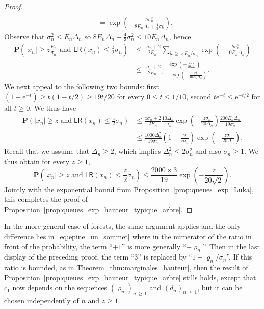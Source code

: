 \documentclass[AHL,Unicode,longabstracts,published]{cedram}
\newcommand{\ensembles}[1]{\mathbf{#1}}
\renewcommand{\P}{\ensembles{P}}
\renewcommand{\Pr}[1]{\P\left(#1\right)}
\newcommand{\1}{\ensembles{1}}
\renewcommand{\le}{\leqslant}
\renewcommand{\ge}{\geqslant}
\newcommand{\LR}{\mathsf{LR}}
\newcommand{\e}{\mathrm{e}}
\newcommand{\edges}{E}
\begin{document}
\begin{proof}
\begin{align*}
\\
&= \exp\left(- \frac{h \sigma_n^2}{8 \edges_n \Delta_n + \frac{4}{3} \sigma_n^2}\right).
\end{align*}
Observe that $\sigma_n^2 \le \edges_n \Delta_n$ so $8 \edges_n \Delta_n + \frac{4}{3} \sigma_n^2 \le 10 \edges_n \Delta_n$, hence
\begin{align*}
\Pr{|x_n| \ge z \frac{\edges_n}{\sigma_n} \text{ and } \LR(x_n) \le \frac{z}{2} \sigma_n} &\le \frac{z \sigma_n + 2}{2 \edges_n} \sum_{h\,\ge\,z\,\edges_n / \sigma_n} \exp\left(- \frac{h \sigma_n^2}{10 \edges_n \Delta_n}\right)
\\
&\le \frac{z \sigma_n + 2}{2 \edges_n}
\frac{\exp\left(- \frac{z \sigma_n}{10 \Delta_n}\right)}{1 - \exp\left(- \frac{\sigma_n^2}{10 \edges_n \Delta_n}\right)}.
\end{align*}
We next appeal to the following two bounds: first $(1-\e^{-t}) \ge t(1 - t/2) \ge 19t/20$ for every $0 \le t \le 1/10$, second $t \e^{-t} \le \e^{-t/2}$ for all $t \ge 0$. We thus have
\begin{align*}
\Pr{|x_n| \ge z\;\text{and}\; \LR(x_n) \le \frac{z}{2} \sigma_n} &\le \frac{z \sigma_n + 2}{2 \edges_n}
\frac{10 \Delta_n}{z \sigma_n} \exp\left(- \frac{z \sigma_n}{20 \Delta_n}\right)
\frac{200 \edges_n \Delta_n}{19 \sigma_n^2}
\\
&\le \frac{1000 \Delta_n^2}{19 \sigma_n^2} \left(1 + \frac{2}{z \sigma_n}\right)
\exp\left(- \frac{z \sigma_n}{20 \Delta_n}\right).
\end{align*}
Recall that we assume that $\Delta_n \ge 2$, which implies $\Delta_n^2 \le 2 \sigma_n^2$ and also $\sigma_n \ge 1$. We thus obtain for every $z \ge 1$,
\[
\Pr{|x_n| \ge z\;\text{and}\; \LR(x_n) \le \frac{z}{2} \sigma_n}
\le \frac{2000 \times 3}{19} \exp\left(- \frac{z}{20 \sqrt{2}}\right).
\]
Jointly with the exponential bound from Proposition~\ref{prop:queues_exp_Luka}, this completes the proof of Proposition~\ref{prop:queues_exp_hauteur_typique_arbre}.
\end{proof}


\begin{rema}\label{rem:queues_exp_hauteur_typique_foret}
In the more general case of forests, the same argument applies and the only difference lies in~\eqref{eq:epine_un_sommet} where in the numerator of the ratio in front of the probability, the term ``$+1$'' is more generally ``$+\varrho_n$''. Then in the last display of the preceding proof, the term ``$3$'' is replaced by ``$1+\varrho_n/\sigma_n$''. If this ratio is bounded, as in Theorem~\ref{thm:marginales_hauteur}, then the result of Proposition~\ref{prop:queues_exp_hauteur_typique_arbre} stills holds, except that $c_1$ now depends on the sequences $(\varrho_n)_{n\,\ge\,1}$ and $(d_n)_{n\,\ge\,1}$, but it can be chosen independently of $n$ and $z \ge 1$.
\end{rema}
\end{document}
